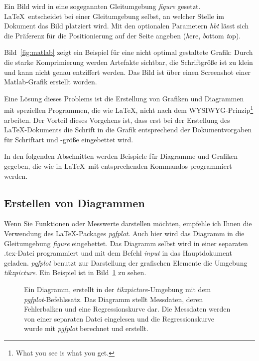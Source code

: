 Ein Bild wird in eine sogegannten Gleitumgebung \textit{figure} gesetzt. \LaTeX~entscheidet bei einer Gleitumgebung selbst, an welcher Stelle im Dokument das Bild platziert wird. Mit den optionalen Parametern \textit{hbt} lässt sich die Präferenz für die Positionierung auf der Seite angeben (\textit{h}ere, \textit{b}ottom \textit{t}op).

Bild~\ref{fig:matlab} zeigt ein Beispiel für eine nicht optimal gestaltete Grafik: Durch die starke Komprimierung werden Artefakte sichtbar, die Schriftgröße ist zu klein und kann nicht genau entziffert werden. Das Bild ist über einen Screenshot einer Matlab-Grafik erstellt worden.


Eine Lösung dieses Problems ist die Erstellung von Grafiken und Diagrammen mit speziellen Programmen, die wie \LaTeX, nicht nach dem WYSIWYG-Prinzip\footnote{What you see is what you get.} arbeiten. Der Vorteil dieses Vorgehens ist, dass erst bei der Erstellung des \LaTeX-Dokuments die Schrift in die Grafik entsprechend der Dokumentvorgaben für Schriftart und -größe eingebettet wird.

In den folgenden Abschnitten werden Beispiele für Diagramme und Grafiken gegeben, die wie in \LaTeX~mit entsprechenden Kommandos programmiert werden.

\subsection{Erstellen von Diagrammen}

Wenn Sie Funktionen oder Messwerte darstellen möchten, empfehle ich Ihnen die Verwendung des \LaTeX-Packages \textit{pgfplot}. Auch hier wird das Diagramm in die Gleitumgebung \textit{figure} eingebettet. Das Diagramm selbst wird in einer separaten .tex-Datei programmiert und mit dem Befehl \textit{input} in das Hauptdokument geladen. \textit{pgfplot} benutzt zur Darstellung der grafischen Elemente die Umgebung \textit{tikzpicture}. Ein Beispiel ist in Bild~\ref{fig:pgfplot} zu sehen.

\begin{figure}[hbt]
	\centering
	
	\caption[Diagramm, mit dem \textit{pgfplot}-Befehlssatz]{Ein Diagramm, erstellt in der \textit{tikzpicture}-Umgebung mit dem \textit{pgfplot}-Befehlssatz. Das Diagramm stellt Messdaten, deren Fehlerbalken und eine Regressionskurve dar. Die Messdaten werden von einer separaten Datei eingelesen und die Regressionskurve wurde mit \textit{pgfplot} berechnet und erstellt.}
	\label{fig:pgfplot}
\end{figure}

